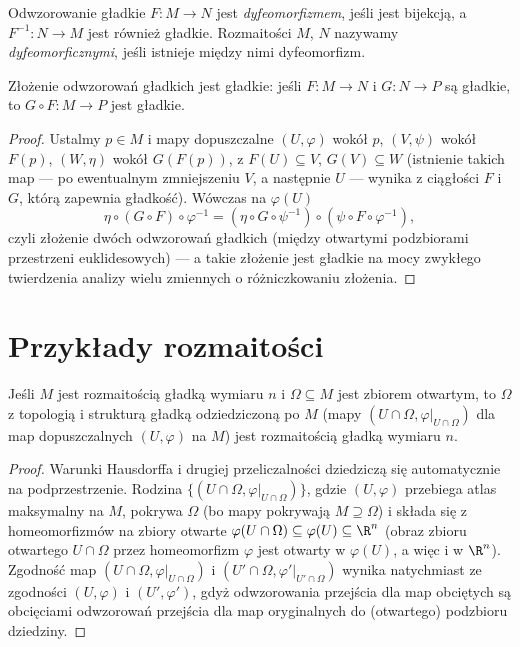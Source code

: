 \begin{definicja}\label{def dyfeo}
Odwzorowanie gładkie $F\colon M\to N$ jest \emph{dyfeomorfizmem}, jeśli jest bijekcją, a
$F^{-1}\colon N\to M$ jest również gładkie. Rozmaitości $M$, $N$ nazywamy
\emph{dyfeomorficznymi}, jeśli istnieje między nimi dyfeomorfizm.
\end{definicja}

\begin{stwierdzenie}
Złożenie odwzorowań gładkich jest gładkie: jeśli $F\colon M\to N$ i $G\colon N\to P$ są
gładkie, to $G\circ F\colon M\to P$ jest gładkie.
\end{stwierdzenie}

\begin{proof}
Ustalmy $p\in M$ i mapy dopuszczalne $(U,\varphi)$ wokół $p$, $(V,\psi)$ wokół $F(p)$,
$(W,\eta)$ wokół $G(F(p))$, z $F(U)\subseteq V$, $G(V)\subseteq W$ (istnienie takich map —
po ewentualnym zmniejszeniu $V$, a następnie $U$ — wynika z ciągłości $F$ i $G$, którą zapewnia gładkość).
Wówczas na $\varphi(U)$
\[
\eta\circ(G\circ F)\circ\varphi^{-1}=(\eta\circ G\circ\psi^{-1})\circ(\psi\circ F\circ
\varphi^{-1}),
\]
czyli złożenie dwóch odwzorowań gładkich (między otwartymi podzbiorami przestrzeni
euklidesowych) — a takie złożenie jest gładkie na mocy zwykłego twierdzenia analizy wielu
zmiennych o różniczkowaniu złożenia.
\end{proof}
\section{Przykłady rozmaitości}

\begin{stwierdzenie}\label{stw:otwarty-podzbior}
Jeśli $M$ jest rozmaitością gładką wymiaru $n$ i $\Omega\subseteq M$ jest zbiorem otwartym,
to $\Omega$ z topologią i strukturą gładką odziedziczoną po $M$ (mapy $(U\cap\Omega,
\varphi|_{U\cap\Omega})$ dla map dopuszczalnych $(U,\varphi)$ na $M$) jest rozmaitością
gładką wymiaru $n$.
\end{stwierdzenie}

\begin{proof}
Warunki Hausdorffa i drugiej przeliczalności dziedziczą się automatycznie na
podprzestrzenie. Rodzina $\{(U\cap\Omega,\varphi|_{U\cap\Omega})\}$, gdzie $(U,\varphi)$
przebiega atlas maksymalny na $M$, pokrywa $\Omega$ (bo mapy pokrywają $M\supseteq\Omega$)
i składa się z homeomorfizmów na zbiory otwarte $\varphi(U\cap\Omega)\subseteq\varphi(U)
\subseteq\R^n$ (obraz zbioru otwartego $U\cap\Omega$ przez homeomorfizm $\varphi$ jest
otwarty w $\varphi(U)$, a więc i w $\R^n$). Zgodność map $(U\cap\Omega,\varphi|_{U\cap
\Omega})$ i $(U'\cap\Omega,\varphi'|_{U'\cap\Omega})$ wynika natychmiast ze zgodności
$(U,\varphi)$ i $(U',\varphi')$, gdyż odwzorowania przejścia dla map obciętych są
obcięciami odwzorowań przejścia dla map oryginalnych do (otwartego) podzbioru dziedziny.
\end{proof}

